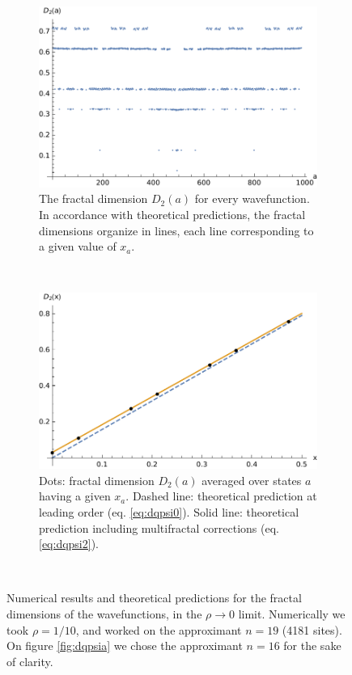 \documentclass[aps,prl,preprint]{revtex4-1}
\begin{document}
\begin{figure}[htp]

\centering
\begin{subfigure}{.5\textwidth}
  \centering
  \includegraphics[width=1.\textwidth]{img/local_dim_wf.pdf}
  \caption{The fractal dimension $D_2(a)$ for every wavefunction. In accordance with theoretical predictions, the fractal dimensions organize in lines, each line corresponding to a given value of $x_a$.}
  \label{fig:dqpsia}
\end{subfigure}%
~
\begin{subfigure}{.5\textwidth}
  \centering
  \includegraphics[width=1.\textwidth]{img/local_wf.pdf}
  \caption{Dots: fractal dimension $D_2(a)$ averaged over states $a$ having a given $x_a$. Dashed line: theoretical prediction at leading order (eq. \eqref{eq:dqpsi0}). Solid line: theoretical prediction including multifractal corrections (eq. \eqref{eq:dqpsi2}).}
  \label{fig:dqpsix}
\end{subfigure} \\

\caption{Numerical results and theoretical predictions for the fractal dimensions of the wavefunctions, in the $\rho \rightarrow 0$ limit. Numerically we took $\rho = 1/10$, and worked on the approximant $n=19$ (4181 sites). On figure \eqref{fig:dqpsia} we chose the approximant $n = 16$ for the sake of clarity.}
\label{fig:dqpsi}
\end{figure}
\end{document}
